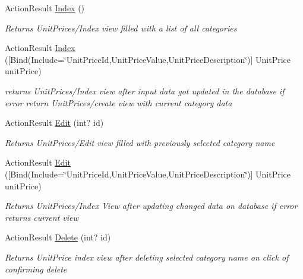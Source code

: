 \begin{DoxyCompactItemize}
\item 
Action\+Result \hyperlink{class_alfa_accounting_1_1_controllers_1_1_unit_prices_controller_ab1aa5af63ac3b67b987e0fd50ebeee05}{Index} ()
\begin{DoxyCompactList}\small\item\em Returns Unit\+Prices/\+Index view filled with a list of all categories \end{DoxyCompactList}\item 
Action\+Result \hyperlink{class_alfa_accounting_1_1_controllers_1_1_unit_prices_controller_a4e1be84e28e21a170e5e0fda5f4a63d2}{Index} (\mbox{[}Bind(Include=\char`\"{}Unit\+Price\+Id,Unit\+Price\+Value,Unit\+Price\+Description\char`\"{})\mbox{]} Unit\+Price unit\+Price)
\begin{DoxyCompactList}\small\item\em returns Unit\+Prices/\+Index view after input data got updated in the database if error return Unit\+Prices/create view with current category data \end{DoxyCompactList}\item 
Action\+Result \hyperlink{class_alfa_accounting_1_1_controllers_1_1_unit_prices_controller_a9313cc325e6706189e9e2a93e570d03b}{Edit} (int? id)
\begin{DoxyCompactList}\small\item\em Returns Unit\+Prices/\+Edit view filled with previously selected category name \end{DoxyCompactList}\item 
Action\+Result \hyperlink{class_alfa_accounting_1_1_controllers_1_1_unit_prices_controller_a8a4eb97f0ffee3d8718b812603e4c358}{Edit} (\mbox{[}Bind(Include=\char`\"{}Unit\+Price\+Id,Unit\+Price\+Value,Unit\+Price\+Description\char`\"{})\mbox{]} Unit\+Price unit\+Price)
\begin{DoxyCompactList}\small\item\em Returns Unit\+Prices/\+Index View after updating changed data on database if error returns current view \end{DoxyCompactList}\item 
Action\+Result \hyperlink{class_alfa_accounting_1_1_controllers_1_1_unit_prices_controller_a19b58ab06090cba97611b12107d0ff69}{Delete} (int? id)
\begin{DoxyCompactList}\small\item\em Returns Unit\+Price index view after deleting selected category name on click of confirming delete \end{DoxyCompactList}\end{DoxyCompactItemize}
